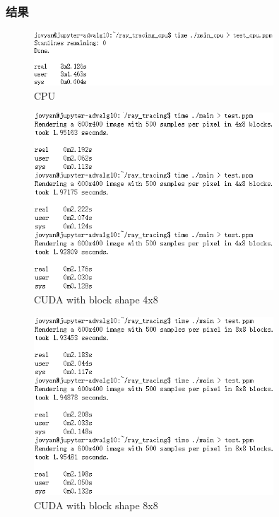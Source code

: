 \documentclass[UTF8, a4paper, 11pt]{article}
\begin{document}
\subsubsection{结果}
\begin{figure}[H]
    \centering
    \includegraphics[width=0.8\textwidth]{cpu.png}
    \caption{CPU}
\end{figure}
\begin{figure}[H]
    \centering
    \includegraphics[width=0.8\textwidth]{4x8.png}
    \caption{CUDA with block shape 4x8}
\end{figure}
\begin{figure}[H]
    \centering
    \includegraphics[width=0.8\textwidth]{8x8.png}
    \caption{CUDA with block shape 8x8}
\end{figure}
\end{document}
